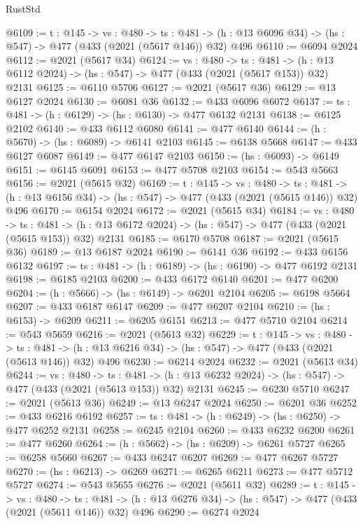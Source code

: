 \begin{lexlean}{RustStd}
\begin{coremodule}
{\begin{coremodule}
{{{{{{{{{{{{{{{{@6109 := {t : @145} ->
  {vs : @480} ->
  {ts : @481} -> (h : @13 @6096 @34) -> (hs : @547) -> @477 (@433 (@2021 (@5617 @146)) @32) @496
@6110 := @6094 @2024
@6112 := @2021 (@5617 @34)
@6124 := {vs : @480} ->
  {ts : @481} -> (h : @13 @6112 @2024) -> (hs : @547) -> @477 (@433 (@2021 (@5617 @153)) @32) @2131
@6125 := @6110 @5706
@6127 := @2021 (@5617 @36)
@6129 := @13 @6127 @2024
@6130 := @6081 @36
@6132 := @433 @6096 @6072
@6137 := {ts : @481} -> (h : @6129) -> (hs : @6130) -> @477 @6132 @2131
@6138 := @6125 @2102
@6140 := @433 @6112 @6080
@6141 := @477 @6140
@6144 := (h : @5670) -> (hs : @6089) -> @6141 @2103
@6145 := @6138 @5668
@6147 := @433 @6127 @6087
@6149 := @477 @6147 @2103
@6150 := (hs : @6093) -> @6149
@6151 := @6145 @6091
@6153 := @477 @5708 @2103
@6154 := @543 @5663
@6156 := @2021 (@5615 @32)
@6169 := {t : @145} ->
  {vs : @480} ->
  {ts : @481} -> (h : @13 @6156 @34) -> (hs : @547) -> @477 (@433 (@2021 (@5615 @146)) @32) @496
@6170 := @6154 @2024
@6172 := @2021 (@5615 @34)
@6184 := {vs : @480} ->
  {ts : @481} -> (h : @13 @6172 @2024) -> (hs : @547) -> @477 (@433 (@2021 (@5615 @153)) @32) @2131
@6185 := @6170 @5708
@6187 := @2021 (@5615 @36)
@6189 := @13 @6187 @2024
@6190 := @6141 @36
@6192 := @433 @6156 @6132
@6197 := {ts : @481} -> (h : @6189) -> (hs : @6190) -> @477 @6192 @2131
@6198 := @6185 @2103
@6200 := @433 @6172 @6140
@6201 := @477 @6200
@6204 := (h : @5666) -> (hs : @6149) -> @6201 @2104
@6205 := @6198 @5664
@6207 := @433 @6187 @6147
@6209 := @477 @6207 @2104
@6210 := (hs : @6153) -> @6209
@6211 := @6205 @6151
@6213 := @477 @5710 @2104
@6214 := @543 @5659
@6216 := @2021 (@5613 @32)
@6229 := {t : @145} ->
  {vs : @480} ->
  {ts : @481} -> (h : @13 @6216 @34) -> (hs : @547) -> @477 (@433 (@2021 (@5613 @146)) @32) @496
@6230 := @6214 @2024
@6232 := @2021 (@5613 @34)
@6244 := {vs : @480} ->
  {ts : @481} -> (h : @13 @6232 @2024) -> (hs : @547) -> @477 (@433 (@2021 (@5613 @153)) @32) @2131
@6245 := @6230 @5710
@6247 := @2021 (@5613 @36)
@6249 := @13 @6247 @2024
@6250 := @6201 @36
@6252 := @433 @6216 @6192
@6257 := {ts : @481} -> (h : @6249) -> (hs : @6250) -> @477 @6252 @2131
@6258 := @6245 @2104
@6260 := @433 @6232 @6200
@6261 := @477 @6260
@6264 := (h : @5662) -> (hs : @6209) -> @6261 @5727
@6265 := @6258 @5660
@6267 := @433 @6247 @6207
@6269 := @477 @6267 @5727
@6270 := (hs : @6213) -> @6269
@6271 := @6265 @6211
@6273 := @477 @5712 @5727
@6274 := @543 @5655
@6276 := @2021 (@5611 @32)
@6289 := {t : @145} ->
  {vs : @480} ->
  {ts : @481} -> (h : @13 @6276 @34) -> (hs : @547) -> @477 (@433 (@2021 (@5611 @146)) @32) @496
@6290 := @6274 @2024
}}}}}}}}}}}}}}}}
\end{coremodule}}
\end{coremodule}
\end{lexlean}
